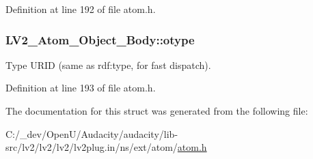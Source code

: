 Definition at line 192 of file atom.\+h.

\subsubsection[{\texorpdfstring{otype}{otype}}]{ L\+V2\+\_\+\+Atom\+\_\+\+Object\+\_\+\+Body\+::otype}\hypertarget{struct_l_v2___atom___object___body_a275302d6dd5d94847097cd5b054c1b6a}{}\label{struct_l_v2___atom___object___body_a275302d6dd5d94847097cd5b054c1b6a}
Type U\+R\+ID (same as rdf\+:type, for fast dispatch). 

Definition at line 193 of file atom.\+h.



The documentation for this struct was generated from the following file\+:\begin{DoxyCompactItemize}
\item 
C\+:/\+\_\+dev/\+Open\+U/\+Audacity/audacity/lib-\/src/lv2/lv2/lv2/lv2plug.\+in/ns/ext/atom/\hyperlink{atom_8h}{atom.\+h}\end{DoxyCompactItemize}
